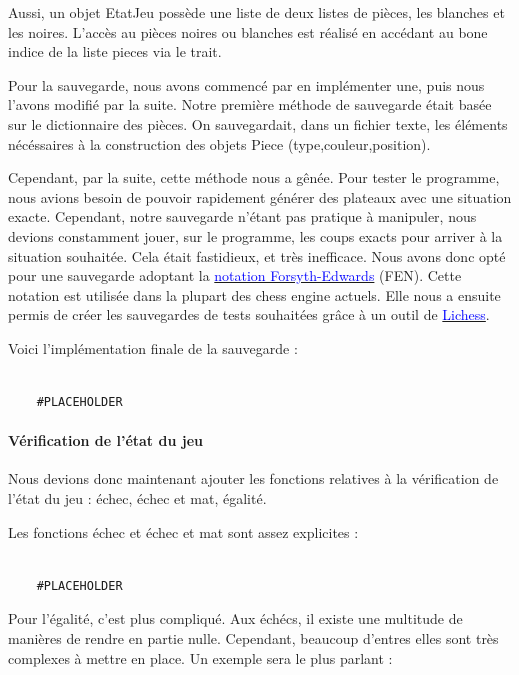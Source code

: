 \documentclass{article}
\begin{document}
Aussi, un objet EtatJeu possède une liste de deux listes de pièces, les blanches et les noires.
L'accès au pièces noires ou blanches est réalisé en accédant au bone indice de la liste pieces via
le trait.

Pour la sauvegarde, nous avons commencé par en implémenter une, puis nous l'avons modifié par la suite.
Notre première méthode de sauvegarde était basée sur le dictionnaire des pièces.
On sauvegardait, dans un fichier texte, les éléments nécéssaires à la construction des objets Piece (type,couleur,position).

Cependant, par la suite, cette méthode nous a gênée. Pour tester le programme, nous avions besoin de pouvoir
rapidement générer des plateaux avec une situation exacte. Cependant, notre sauvegarde n'étant pas pratique à manipuler,
nous devions constamment jouer, sur le programme, les coups exacts pour arriver à la situation souhaitée. Cela était
fastidieux, et très inefficace. 
Nous avons donc opté pour une sauvegarde adoptant la \href{https://fr.wikipedia.org/wiki/Notation_Forsyth-Edwards}{\textcolor{blue}{notation Forsyth-Edwards}} (FEN).
Cette notation est utilisée dans la plupart des chess engine actuels. Elle nous a ensuite permis de créer les sauvegardes
de tests souhaitées grâce à un outil de \href{https://lichess.org/fr}{\textcolor{blue}{Lichess}}.

Voici l'implémentation finale de la sauvegarde :
\begin{verbatim}

    #PLACEHOLDER
\end{verbatim}

\paragraph{Vérification de l'état du jeu}
Nous devions donc maintenant ajouter les fonctions relatives à la vérification de l'état du jeu
: échec, échec et mat, égalité. 

Les fonctions échec et échec et mat sont assez explicites :
\begin{verbatim}

    #PLACEHOLDER
\end{verbatim}

Pour l'égalité, c'est plus compliqué.
Aux échécs, il existe une multitude de manières de rendre en partie nulle. Cependant, beaucoup d'entres elles sont 
très complexes à mettre en place. Un exemple sera le plus parlant : 
\end{document}
